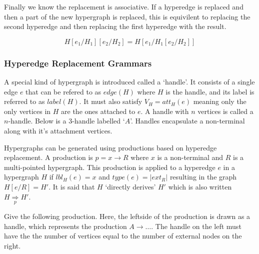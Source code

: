     Finally we know the replacement is associative. If a hyperedge is replaced and then a part of the new hypergraph is replaced, this is equivilent to replacing the second hyperedge and then replacing the first hyperedge with the result.

    \begin{equation}
    H[e_1/H_1][e_2/H_2] = H[e_1/H_1 [e_2/H_2]]
    \end{equation}

  \subsubsection{Hyperedge Replacement Grammars}

    A special kind of hypergraph is introduced called a `handle'. It consists of a single edge $e$ that can be refered to as $edge(H)$ where $H$ is the handle, and its label is referred to as $label(H)$. It must also satisfy $V_H = att_H(e)$ meaning only the only vertices in $H$ are the ones attached to $e$. A handle with $n$ vertices is called a $n$-handle. Below is a 3-handle labelled `$A$'. Handles encapsulate a non-terminal along with it's attachment vertices.

    \begin{center}
    \end{center}

    Hypergraphs can be generated using productions based on hyperedge replacement. A production is $p = x \to R$ where $x$ is a non-terminal and $R$ is a multi-pointed hypergraph. This production is applied to a hyperedge $e$ in a hypergraph $H$ if $lbl_H(e) = x$ and $type(e) = |ext_R|$ resulting in the graph $H[e / R] = H'$. It is said that $H$ `directly derives' $H'$ which is also written $H \underset{p}{\Rightarrow} H'$.

    Give the following production. Here, the leftside of the production is drawn as a handle, which represents the production $A \to \dots$. The handle on the left must have the the number of vertices equal to the number of external nodes on the right.
    

